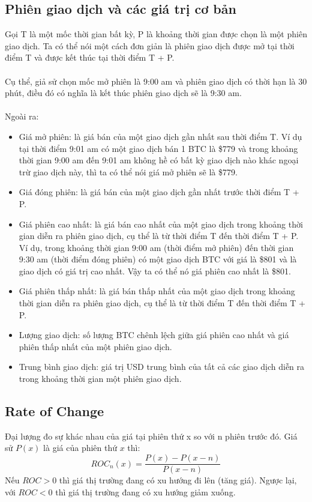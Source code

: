 \subsection{Phiên giao dịch và các giá trị cơ bản}
Gọi T là một mốc thời gian bất kỳ, P là khoảng thời gian được chọn là một phiên 
giao dịch. Ta có thể nói một cách đơn giản là phiên giao dịch được mở tại thời 
điểm T và được kết thúc tại thời điểm T + P.\\\\
Cụ thể, giả sử chọn mốc mở phiên là 9:00 am và phiên giao dịch có thời hạn là 
30 phút, điều đó có nghĩa là kết thúc phiên giao dịch sẽ là 9:30 am.\\\\
Ngoài ra:
\begin{itemize}
\item Giá mở phiên: là giá bán của một giao dịch gần nhất sau thời điểm T. Ví dụ tại thời 
điểm 9:01 am có một giao dịch bán 1 BTC là \$779 và trong khoảng thời gian 9:00 am 
đến 9:01 am không hề có bất kỳ giao dịch nào khác ngoại trừ giao dịch này, thì ta có thể 
nói giá mở phiên sẽ là \$779.
\item Giá đóng phiên: là giá bán của một giao dịch gần nhất trước thời điểm T + P.
\item Giá phiên cao nhất: là giá bán cao nhất của một giao dịch trong khoảng thời gian diễn ra phiên 
giao dịch, cụ thể là từ thời điểm T đến thời điểm T + P. Ví dụ, trong khoảng thời gian 9:00 am (thời điểm 
mở phiên) đến thời gian 9:30 am (thời điểm đóng phiên) có một giao dịch BTC với giá là 
\$801 và là giao dịch có giá trị cao nhất. Vậy ta có thể nó giá phiên cao nhất là 
\$801.
\item Giá phiên thấp nhất: là giá bán thấp nhất của một giao dịch trong khoảng thời gian diễn ra phiên 
giao dịch, cụ thể là từ thời điểm T đến thời điểm T + P.
\item Lượng giao dịch: số lượng BTC chênh lệch giữa giá phiên cao nhất và giá phiên 
thấp nhất của một phiên giao dịch.
\item Trung bình giao dịch: giá trị USD trung bình của tất cả các giao dịch diễn 
ra trong khoảng thời gian một phiên giao dịch.
\end{itemize}
\subsection{Rate of Change}
Đại lượng đo sự khác nhau của giá tại phiên thứ x so với n phiên trước đó. 
Giá sử $P(x)$ là giá của phiên thứ $x$ thì:
\[ ROC_{n}(x)=\frac{P(x)-P(x-n)}{P(x-n)}\]
Nếu $ROC > 0$ thì giá thị trường đang có xu hướng đi lên (tăng giá).
Ngược lại, với $ROC < 0$ thì giá thị trường đang có xu hướng giảm xuống.

